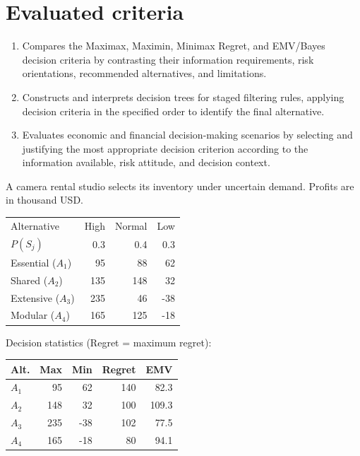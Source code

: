 \section*{Evaluated criteria}
\begin{enumerate}[label=\textbf{C\arabic*},start=8]
\item Compares the Maximax, Maximin, Minimax Regret, and EMV/Bayes decision criteria by contrasting their information requirements, risk orientations, recommended alternatives, and limitations.
\item Constructs and interprets decision trees for staged filtering rules, applying decision criteria in the specified order to identify the final alternative.
\item Evaluates economic and financial decision-making scenarios by selecting and justifying the most appropriate decision criterion according to the information available, risk attitude, and decision context.
\end{enumerate}



A camera rental studio selects its inventory under uncertain demand. Profits are in thousand USD.

\vspace{-3mm}
\begin{center}\small\setlength{\tabcolsep}{4pt}
	\begin{tabular}{lrrr}\toprule
		Alternative & High & Normal & Low\\
		$P(S_j)$ & 0.3 & 0.4 & 0.3\\ \midrule
				Essential ($A_1$) & 95 & 88 & 62\\
		Shared ($A_2$) & 135 & 148 & 32\\
		Extensive ($A_3$) & 235 & 46 & -38\\
		Modular ($A_4$) & 165 & 125 & -18\\
		\bottomrule
	\end{tabular}
\end{center} \vspace*{-3mm}

Decision statistics (Regret = maximum regret):

\vspace{-3mm}
\begin{center}\small\setlength{\tabcolsep}{4pt}
	\begin{tabular}{lrrrr}\toprule
		Alt. & Max & Min & Regret & EMV\\ \midrule
				$A_1$ & 95 & 62 & 140 & 82.3\\
		$A_2$ & 148 & 32 & 100 & 109.3\\
		$A_3$ & 235 & -38 & 102 & 77.5\\
		$A_4$ & 165 & -18 & 80 & 94.1\\
		\bottomrule
	\end{tabular}
\end{center}
\vspace{-3mm}

